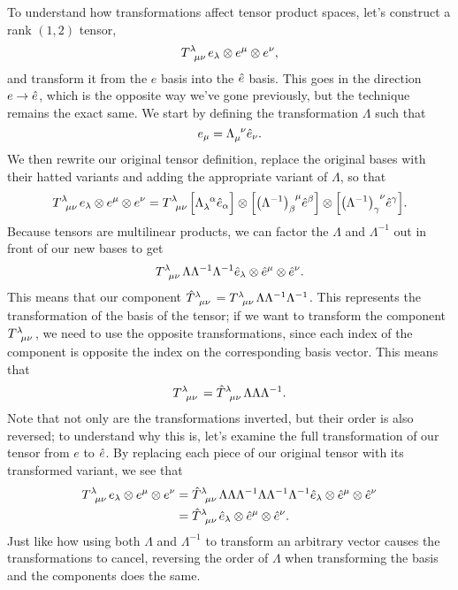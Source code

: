 To understand how transformations affect tensor product spaces, let's construct a rank $(1,2)$ tensor,
\[ \tensor{T}{^\lambda_{\mu\nu}} e_\lambda \otimes e^\mu \otimes e^\nu, \]
and transform it from the $e$ basis into the $\Hat{e}$ basis.
This goes in the direction $e \to \Hat{e}$, which is the opposite way we've gone previously, but the technique remains the exact same.
We start by defining the transformation $\Lambda$ such that
\[ e_\mu = \tensor{\Lambda}{_\mu^\nu} \Hat{e}_\nu. \]
We then rewrite our original tensor definition, replace the original bases with their hatted variants and adding the appropriate variant of $\Lambda$, so that
\[ \tensor{T}{^\lambda_{\mu\nu}}e_\lambda \otimes e^\mu \otimes e^\nu = \tensor{T}{^\lambda_{\mu\nu}} \Big[\tensor{\Lambda}{_\lambda^\alpha}\Hat{e}_\alpha\Big] \otimes \qty[\tensor{\qty(\Lambda^{-1})}{_\beta^\mu}\Hat{e}^\beta] \otimes \qty[\tensor{\qty(\Lambda^{-1})}{_\gamma^\nu}\Hat{e}^\gamma]. \]
Because tensors are multilinear products, we can factor the $\Lambda$ and $\Lambda^{-1}$ out in front of our new bases to get
\[ \tensor{T}{^\lambda_{\mu\nu}}\Lambda\Lambda^{-1}\Lambda^{-1} \Hat{e}_\lambda \otimes \Hat{e}^\mu \otimes \Hat{e}^\nu. \]
This means that our component $\tensor{\Hat{T}}{^\lambda_{\mu\nu}} = \tensor{T}{^\lambda_{\mu\nu}}\Lambda\Lambda^{-1}\Lambda^{-1}$.
This represents the transformation of the basis of the tensor; if we want to transform the component $\tensor{T}{^\lambda_{\mu\nu}}$, we need to use the opposite transformations, since each index of the component is opposite the index on the corresponding basis vector.
This means that 
\[ \tensor{T}{^\lambda_{\mu\nu}} = \tensor{\Hat{T}}{^\lambda_{\mu\nu}}\Lambda\Lambda\Lambda^{-1}. \]
Note that not only are the transformations inverted, but their order is also reversed; to understand why this is, let's examine the full transformation of our tensor from $e$ to $\Hat{e}$.
By replacing each piece of our original tensor with its transformed variant, we see that
\begin{align*}
    \tensor{T}{^\lambda_{\mu\nu}}e_\lambda \otimes e^\mu \otimes e^\nu &= 
    \tensor{\Hat{T}}{^\lambda_{\mu\nu}}\Lambda\Lambda\Lambda^{-1}\Lambda\Lambda^{-1}\Lambda^{-1} \Hat{e}_\lambda \otimes \Hat{e}^\mu \otimes \Hat{e}^\nu \\
    &= \tensor{\Hat{T}}{^\lambda_{\mu\nu}}\Hat{e}_\lambda \otimes \Hat{e}^\mu \otimes \Hat{e}^\nu.
\end{align*}
Just like how using both $\Lambda$ and $\Lambda^{-1}$ to transform an arbitrary vector causes the transformations to cancel, reversing the order of $\Lambda$ when transforming the basis and the components does the same.

